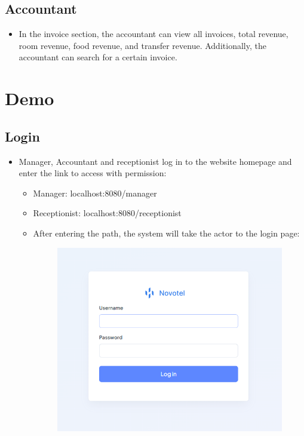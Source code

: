     \subsection{Accountant}
    \begin{itemize}
        \item In the invoice section, the accountant can view all invoices, total revenue, room revenue, food revenue, and transfer revenue. Additionally, the accountant can search for a certain invoice.
    \end{itemize}
    \section{Demo}
    \subsection{Login}
    \begin{itemize}
        \item Manager, Accountant and receptionist log in to the website homepage and enter the link to access with permission:
        \begin{itemize}
            \item Manager: localhost:8080/manager
            \item Receptionist: localhost:8080/receptionist
            \item After entering the path, the system will take the actor to the login page:
            \begin{figure}[H]
                \includegraphics[width=1\linewidth]{img/login.png}
                \label{fig:Login}
            \end{figure}
        \end{itemize}
    \end{itemize}
